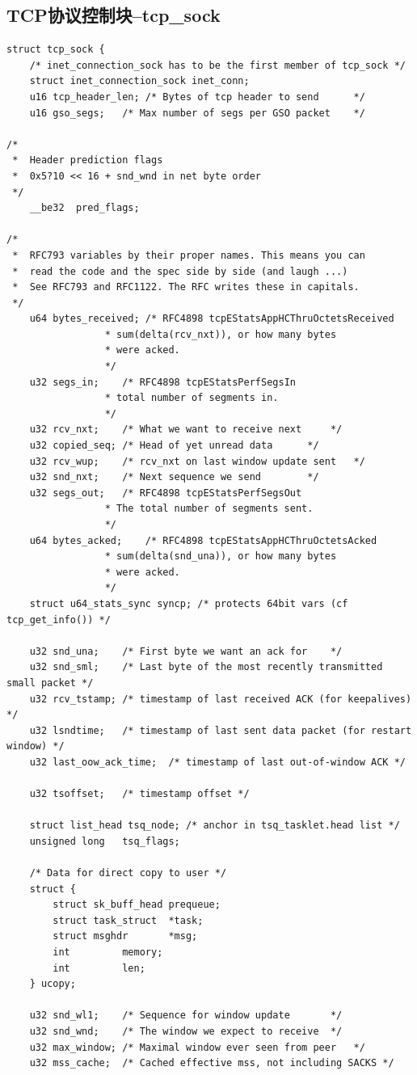 \documentclass[11pt, a4paper,oneside]{book}
\theoremstyle{ocrenumbox}
\theoremstyle{purplenumbox}
\theoremstyle{blackbox}
\begin{document}
		\subsection{TCP协议控制块--tcp\_sock}
\begin{verbatim}
struct tcp_sock {
	/* inet_connection_sock has to be the first member of tcp_sock */
	struct inet_connection_sock	inet_conn;
	u16	tcp_header_len;	/* Bytes of tcp header to send		*/
	u16	gso_segs;	/* Max number of segs per GSO packet	*/

/*
 *	Header prediction flags
 *	0x5?10 << 16 + snd_wnd in net byte order
 */
	__be32	pred_flags;

/*
 *	RFC793 variables by their proper names. This means you can
 *	read the code and the spec side by side (and laugh ...)
 *	See RFC793 and RFC1122. The RFC writes these in capitals.
 */
	u64	bytes_received;	/* RFC4898 tcpEStatsAppHCThruOctetsReceived
				 * sum(delta(rcv_nxt)), or how many bytes
				 * were acked.
				 */
	u32	segs_in;	/* RFC4898 tcpEStatsPerfSegsIn
				 * total number of segments in.
				 */
 	u32	rcv_nxt;	/* What we want to receive next 	*/
	u32	copied_seq;	/* Head of yet unread data		*/
	u32	rcv_wup;	/* rcv_nxt on last window update sent	*/
 	u32	snd_nxt;	/* Next sequence we send		*/
	u32	segs_out;	/* RFC4898 tcpEStatsPerfSegsOut
				 * The total number of segments sent.
				 */
	u64	bytes_acked;	/* RFC4898 tcpEStatsAppHCThruOctetsAcked
				 * sum(delta(snd_una)), or how many bytes
				 * were acked.
				 */
	struct u64_stats_sync syncp; /* protects 64bit vars (cf tcp_get_info()) */

 	u32	snd_una;	/* First byte we want an ack for	*/
 	u32	snd_sml;	/* Last byte of the most recently transmitted small packet */
	u32	rcv_tstamp;	/* timestamp of last received ACK (for keepalives) */
	u32	lsndtime;	/* timestamp of last sent data packet (for restart window) */
	u32	last_oow_ack_time;  /* timestamp of last out-of-window ACK */

	u32	tsoffset;	/* timestamp offset */

	struct list_head tsq_node; /* anchor in tsq_tasklet.head list */
	unsigned long	tsq_flags;

	/* Data for direct copy to user */
	struct {
		struct sk_buff_head	prequeue;
		struct task_struct	*task;
		struct msghdr		*msg;
		int			memory;
		int			len;
	} ucopy;

	u32	snd_wl1;	/* Sequence for window update		*/
	u32	snd_wnd;	/* The window we expect to receive	*/
	u32	max_window;	/* Maximal window ever seen from peer	*/
	u32	mss_cache;	/* Cached effective mss, not including SACKS */


\end{verbatim}
\end{document}
